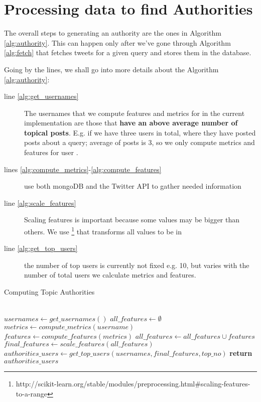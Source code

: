 \section{Processing data to find Authorities}
\label{sec:process-authorities}

The overall steps to generating an authority are the ones in Algorithm \ref{alg:authority}. This can happen only after we've gone through Algorithm \ref{alg:fetch} that fetches tweets for a given query and stores them in the database.

Going by the lines, we shall go into more details about the Algorithm \ref{alg:authority}:
\begin{description}
    \item[line \ref{alg:get_usernames}] The usernames that we compute features and metrics for in the current implementation are those that \textbf{have an above average number of topical posts}. E.g. if we have three users  in total, where they have  posted posts about a query; average of posts is 3, so we only compute metrics and features for user .
	\item[lines \ref{alg:compute_metrics}-\ref{alg:compute_features}] use both mongoDB and the Twitter API to gather needed information
    \item[line \ref{alg:scale_features}] Scaling features is important because some values may be bigger than others. We use \footnote{\label{fn:sklearn_minmaxscale}http://scikit-learn.org/stable/modules/preprocessing.html\#scaling-features-to-a-range} that transforms all values to be in \codeblock{[0,1]}
    \item[line \ref{alg:get_top_users}] the number of top users is currently not fixed e.g. 10, but varies with the number of total users we calculate metrics and features.
\end{description}

\begin{algorithm}
\caption{Computing Topic Authorities}\label{alg:authority}
\begin{algorithmic}[1]
\\ 
\State {}
\State {}
\State $usernames \gets get\_usernames()$\label{alg:get_usernames}
\State
\State $all\_features \gets \emptyset$
	\State $metrics \gets compute\_metrics(username)$\label{alg:compute_metrics}
    \State $features \gets compute\_features(metrics)$\label{alg:compute_features}
    \State $all\_features \gets all\_features \cup features$
\EndFor
\State
\State $final\_features \gets scale\_features(all\_features)$\label{alg:scale_features}
\State {}
\State $authorities\_users \gets get\_top\_users(usernames, final\_features, top\_no)$\label{alg:get_top_users}
\State
\State \textbf{return} $authorities\_users$
\EndProcedure
\end{algorithmic}
\end{algorithm}

